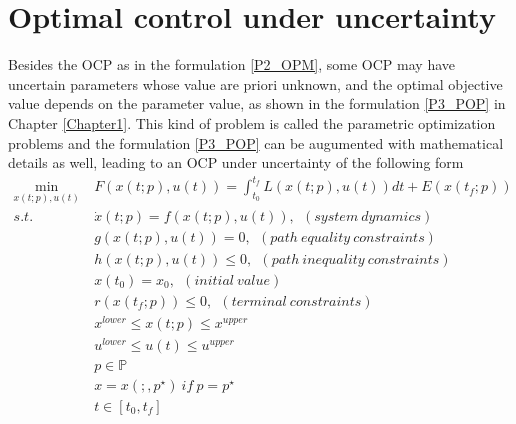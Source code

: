 \documentclass  [
  paper    = a4,
  BCOR     = 10mm,
  twoside,
  fontsize = 12pt,
  fleqn,
  toc      = bibnumbered,
  toc      = listofnumbered,
  numbers  = noendperiod,
  headings = normal,
  listof   = leveldown,
  version  = 3.03
]                                       {scrreprt}
\newcommand{\<}{\langle}
\renewcommand{\>}{\rangle}
\begin{document}
\chapter{Optimal control under uncertainty}
\label{Chapter3}
Besides the OCP as in the formulation \ref{P2_OPM}, some OCP may have uncertain parameters whose value are priori unknown, and the optimal objective value depends on the parameter value, as shown in the formulation \ref{P3_POP} in Chapter \ref{Chapter1}. This kind of problem is called the parametric optimization problems and the formulation \ref{P3_POP}  can be augumented with mathematical details as well, leading to an OCP under uncertainty of the following form
	\begin{subequations}
	\begin{align}
		\underset{x(t;p), u(t)}{\text{min}}   \ &  F(x(t;p), u(t))  = \int_{t_0}^{t_f}L(x(t;p), u(t))dt + E (x(t_f;p)) \label{P4_cost} \\
		s.t.\ \ &  \dot{x} (t;p) = f(x(t;p), u(t)), \ \ (system \ dynamics)   \label{P4_sd} \\
		& g(x(t;p), u(t)) = 0, \ \  (path\  equality\  constraints)  \label{P4_ec}\\
		& h(x(t;p), u(t)) \leq 0, \ \ (path\  inequality \ constraints)  \label{P4_inc}\\
		& x(t_0) = x_0, \ \ (initial \ value) \\
		& r(x(t_f; p)) \leq 0, \ \ (terminal \ constraints)  \label{P4_final} \\
		& x^{lower} \leq x(t;p) \leq x^{upper}   \label{P4_box_x} \\ 
		& u^{lower} \leq u(t) \leq u^{upper}   \label{P4_box_u} \\ 
		& p  \in   \mathbb{P}  \\
		& x = x(;,p^\star) \ if \ p = p^\star \\
		& t \in [t_0, t_f]
	\end{align}
	\label{P4_OCPPara}
\end{subequations}  
\end{document}
